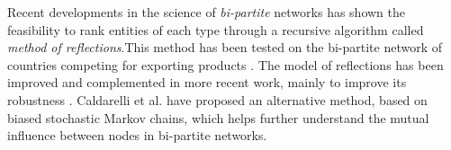 Recent developments in the science of {\it bi-partite} networks has shown the feasibility to rank entities of each type through a recursive algorithm called  {\it method of reflections}.This method has been tested on the bi-partite network of countries competing for exporting products \cite{hidalgo2007,hidalgo2009}. The model of reflections has been improved and complemented in more recent work, mainly to improve its robustness \cite{tacchella2012new, cristelli2012competitors, tacchella2013economic, cristelli2013measuring}. Caldarelli et al.\cite{caldarelli2012network} have proposed an alternative method, based on biased stochastic Markov chains, which helps further understand the mutual influence between nodes in bi-partite networks.




